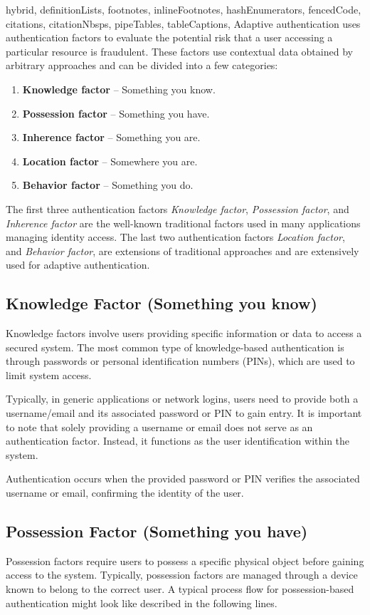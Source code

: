 \documentclass[
  digital,     %
  oneside,     %
  nosansbold,  %
  nocolorbold, %
  lof,         %
  lot,         %
]{fithesis4}
\begin{document}
\begin{markdown*}{%
  hybrid,
  definitionLists,
  footnotes,
  inlineFootnotes,
  hashEnumerators,
  fencedCode,
  citations,
  citationNbsps,
  pipeTables,
  tableCaptions,
}
Adaptive authentication uses authentication factors to evaluate the potential risk that a user accessing a particular resource is fraudulent.
\newline
\newline
These factors use contextual data obtained by arbitrary approaches and can be divided into a few categories:

\begin{enumerate}
    \item \textbf{Knowledge factor} -- Something you know.
    \item \textbf{Possession factor} -- Something you have.
    \item \textbf{Inherence factor} -- Something you are.
    \item \textbf{Location factor} -- Somewhere you are.
    \item \textbf{Behavior factor} -- Something you do.
\end{enumerate}

The first three authentication factors \textit{Knowledge factor}, \textit{Possession factor}, and \textit{Inherence factor} are the well-known traditional factors used in many applications managing identity access.
The last two authentication factors \textit{Location factor}, and \textit{Behavior factor}, are extensions of traditional approaches and are extensively used for adaptive authentication.\cite{auth-factors-descope}  

\newpage
\subsection{Knowledge Factor (Something you know)}
Knowledge factors involve users providing specific information or data to access a secured system.
The most common type of knowledge-based authentication is through passwords or personal identification numbers (PINs), which are used to limit system access.

Typically, in generic applications or network logins, users need to provide both a username/email and its associated password or PIN to gain entry. It is important to note that solely providing a username or email does not serve as an authentication factor.
Instead, it functions as the user identification within the system.

Authentication occurs when the provided password or PIN verifies the associated username or email, confirming the identity of the user.

\subsection{Possession Factor (Something you have)}
Possession factors require users to possess a specific physical object before gaining access to the system.
Typically, possession factors are managed through a device known to belong to the correct user.
A typical process flow for possession-based authentication might look like described in the following lines.


\end{markdown*}
\end{document}
